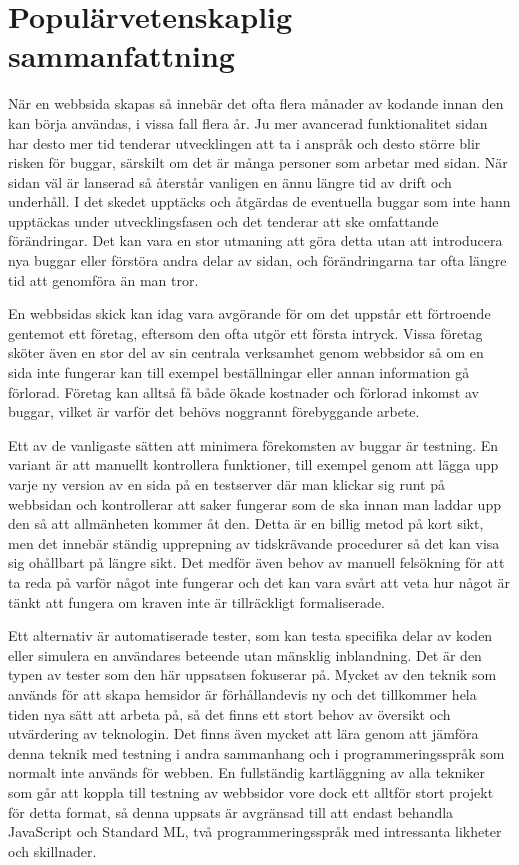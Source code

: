 \newpage
\null
\newpage

\section*{Populärvetenskaplig sammanfattning}

När en webbsida skapas så innebär det ofta flera månader av kodande innan den kan börja användas, i vissa fall flera år. Ju mer avancerad funktionalitet sidan har desto mer tid tenderar utvecklingen att ta i anspråk och desto större blir risken för buggar, särskilt om det är många personer som arbetar med sidan. När sidan väl är lanserad så återstår vanligen en ännu längre tid av drift och underhåll. I det skedet upptäcks och åtgärdas de eventuella buggar som inte hann upptäckas under utvecklingsfasen och det tenderar att ske omfattande förändringar. Det kan vara en stor utmaning att göra detta utan att introducera nya buggar eller förstöra andra delar av sidan, och förändringarna tar ofta längre tid att genomföra än man tror.

En webbsidas skick kan idag vara avgörande för om det uppstår ett förtroende gentemot ett företag, eftersom den ofta utgör ett första intryck. Vissa företag sköter även en stor del av sin centrala verksamhet genom webbsidor så om en sida inte fungerar kan till exempel beställningar eller annan information gå förlorad. Företag kan alltså få både ökade kostnader och förlorad inkomst av buggar, vilket är varför det behövs noggrannt förebyggande arbete.

Ett av de vanligaste sätten att minimera förekomsten av buggar är testning. En variant är att manuellt kontrollera funktioner, till exempel genom att lägga upp varje ny version av en sida på en testserver där man klickar sig runt på webbsidan och kontrollerar att saker fungerar som de ska innan man laddar upp den så att allmänheten kommer åt den. Detta är en billig metod på kort sikt, men det innebär ständig upprepning av tidskrävande procedurer så det kan visa sig ohållbart på längre sikt. Det medför även behov av manuell felsökning för att ta reda på varför något inte fungerar och det kan vara svårt att veta hur något är tänkt att fungera om kraven inte är tillräckligt formaliserade.

Ett alternativ är automatiserade tester, som kan testa specifika delar av koden eller simulera en användares beteende utan mänsklig inblandning. Det är den typen av tester som den här uppsatsen fokuserar på. Mycket av den teknik som används för att skapa hemsidor är förhållandevis ny och det tillkommer hela tiden nya sätt att arbeta på, så det finns ett stort behov av översikt och utvärdering av teknologin. Det finns även mycket att lära genom att jämföra denna teknik med testning i andra sammanhang och i programmeringsspråk som normalt inte används för webben. En fullständig kartläggning av alla tekniker som går att koppla till testning av webbsidor vore dock ett alltför stort projekt för detta format, så denna uppsats är avgränsad till att endast behandla JavaScript och Standard ML, två programmeringsspråk med intressanta likheter och skillnader.


